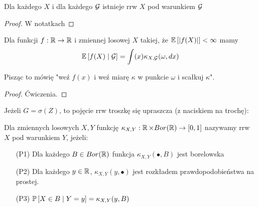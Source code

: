 \begin{theorem}
  Dla każdego $X$ i dla każdego $\mathcal{G}$ istnieje rrw $X$ pod warunkiem $\mathcal{G}$
\end{theorem}

\begin{proof}
  W notatkach
\end{proof}

\begin{fact}
  Dla funkcji $f:\operatorname{\mathbb{R}}\to\operatorname{\mathbb{R}}$ i zmiennej losowej $X$ takiej, że $\expected{|f(X)|}<\infty$ mamy
  $$\expected{f(X)}{\set{G}}=\int(x)\kappa_{X,\set{G}}(\omega,dx)$$
\end{fact}

Pisząc to mówię "weź $f(x)$ i weź miarę $\kappa$ w punkcie $\omega$ i scałkuj $\kappa$".

\begin{proof}
  Ćwiczenia.
\end{proof}

Jeżeli $G=\sigma(Z)$, to pojęcie rrw troszkę się upraszcza (z naciskiem na trochę):

\begin{definition}
  Dla zmiennych losowych $X,Y$ funkcję $\kappa_{X,Y}:\operatorname{\mathbb{R}}\times Bor(\operatorname{\mathbb{R}})\to[0,1]$ nazywamy rrw $X$ pod warunkiem $Y$, jeżeli:
  \begin{itemize}
    \item[(P1)] Dla każdego $B\in Bor(\operatorname{\mathbb{R}})$ funkcja $\kappa_{X,Y}(\bullet, B)$ jest borelowska
    \item[(P2)] Dla każdego $y\in\operatorname{\mathbb{R}}$, $\kappa_{X,Y}(y,\bullet)$ jest rozkładem prawdopodobieństwa na prostej.
    \item[(P3)] $\prob{X\in B}{Y=y}=\kappa_{X,Y}(y, B)$
  \end{itemize}
\end{definition}

